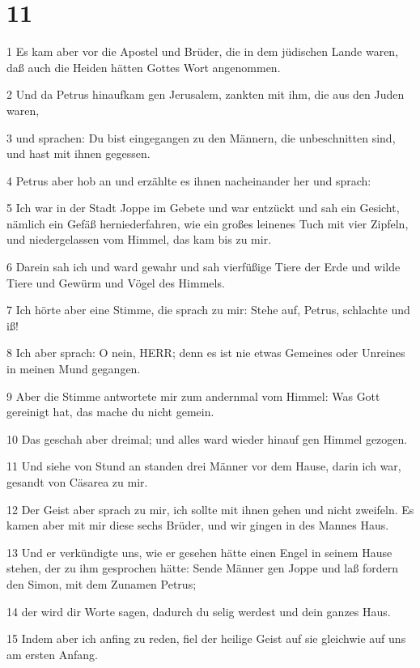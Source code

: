 \chapter{11}

\par 1 Es kam aber vor die Apostel und Brüder, die in dem jüdischen Lande waren, daß auch die Heiden hätten Gottes Wort angenommen.
\par 2 Und da Petrus hinaufkam gen Jerusalem, zankten mit ihm, die aus den Juden waren,
\par 3 und sprachen: Du bist eingegangen zu den Männern, die unbeschnitten sind, und hast mit ihnen gegessen.
\par 4 Petrus aber hob an und erzählte es ihnen nacheinander her und sprach:
\par 5 Ich war in der Stadt Joppe im Gebete und war entzückt und sah ein Gesicht, nämlich ein Gefäß herniederfahren, wie ein großes leinenes Tuch mit vier Zipfeln, und niedergelassen vom Himmel, das kam bis zu mir.
\par 6 Darein sah ich und ward gewahr und sah vierfüßige Tiere der Erde und wilde Tiere und Gewürm und Vögel des Himmels.
\par 7 Ich hörte aber eine Stimme, die sprach zu mir: Stehe auf, Petrus, schlachte und iß!
\par 8 Ich aber sprach: O nein, HERR; denn es ist nie etwas Gemeines oder Unreines in meinen Mund gegangen.
\par 9 Aber die Stimme antwortete mir zum andernmal vom Himmel: Was Gott gereinigt hat, das mache du nicht gemein.
\par 10 Das geschah aber dreimal; und alles ward wieder hinauf gen Himmel gezogen.
\par 11 Und siehe von Stund an standen drei Männer vor dem Hause, darin ich war, gesandt von Cäsarea zu mir.
\par 12 Der Geist aber sprach zu mir, ich sollte mit ihnen gehen und nicht zweifeln. Es kamen aber mit mir diese sechs Brüder, und wir gingen in des Mannes Haus.
\par 13 Und er verkündigte uns, wie er gesehen hätte einen Engel in seinem Hause stehen, der zu ihm gesprochen hätte: Sende Männer gen Joppe und laß fordern den Simon, mit dem Zunamen Petrus;
\par 14 der wird dir Worte sagen, dadurch du selig werdest und dein ganzes Haus.
\par 15 Indem aber ich anfing zu reden, fiel der heilige Geist auf sie gleichwie auf uns am ersten Anfang.
